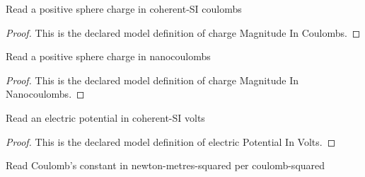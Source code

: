 \begin{definition}
  \label{def:physics:phyx-mini-0867:phyxminiproblems-problemphyxmini0867-chargemagnitudeincoulombs}
  Read a positive sphere charge in coherent-SI coulombs
\end{definition}
\begin{proof}
  This is the declared model definition of charge Magnitude In Coulombs.
\end{proof}
\begin{definition}
  \label{def:physics:phyx-mini-0867:phyxminiproblems-problemphyxmini0867-chargemagnitudeinnanocoulombs}
  Read a positive sphere charge in nanocoulombs
\end{definition}
\begin{proof}
  This is the declared model definition of charge Magnitude In Nanocoulombs.
\end{proof}
\begin{definition}
  \label{def:physics:phyx-mini-0867:phyxminiproblems-problemphyxmini0867-electricpotentialinvolts}
  Read an electric potential in coherent-SI volts
\end{definition}
\begin{proof}
  This is the declared model definition of electric Potential In Volts.
\end{proof}
\begin{definition}
  \label{def:physics:phyx-mini-0867:phyxminiproblems-problemphyxmini0867-coulombconstantinnewtonmeterssquaredpercoulombsquared}
  Read Coulomb's constant in newton-metres-squared per coulomb-squared
\end{definition}
